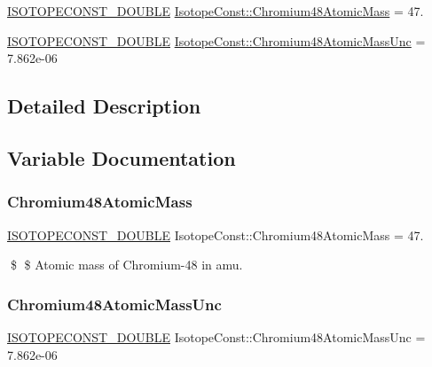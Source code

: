 \begin{DoxyCompactItemize}
\item 
\mbox{\hyperlink{group___isotope_const-_macros_ga8f45a7272ce02c0b4c65c44636ed719a}{I\+S\+O\+T\+O\+P\+E\+C\+O\+N\+S\+T\+\_\+\+D\+O\+U\+B\+LE}} \mbox{\hyperlink{group___isotope_const-_chromium-_cr48_ga2ec4b802d79b0cb09c93fd1cb402b403}{Isotope\+Const\+::\+Chromium48\+Atomic\+Mass}} = 47.
\item 
\mbox{\hyperlink{group___isotope_const-_macros_ga8f45a7272ce02c0b4c65c44636ed719a}{I\+S\+O\+T\+O\+P\+E\+C\+O\+N\+S\+T\+\_\+\+D\+O\+U\+B\+LE}} \mbox{\hyperlink{group___isotope_const-_chromium-_cr48_gad01af998d204021ed9699705cdabb0e0}{Isotope\+Const\+::\+Chromium48\+Atomic\+Mass\+Unc}} = 7.\+862e-\/06
\end{DoxyCompactItemize}


\subsection{Detailed Description}


\subsection{Variable Documentation}
\mbox{\label{group___isotope_const-_chromium-_cr48_ga2ec4b802d79b0cb09c93fd1cb402b403}} 
\subsubsection{\texorpdfstring{Chromium48\+Atomic\+Mass}{Chromium48AtomicMass}}
{\footnotesize\ttfamily \mbox{\hyperlink{group___isotope_const-_macros_ga8f45a7272ce02c0b4c65c44636ed719a}{I\+S\+O\+T\+O\+P\+E\+C\+O\+N\+S\+T\+\_\+\+D\+O\+U\+B\+LE}} Isotope\+Const\+::\+Chromium48\+Atomic\+Mass = 47.}

\$ \$ Atomic mass of Chromium-\/48 in amu. \mbox{\label{group___isotope_const-_chromium-_cr48_gad01af998d204021ed9699705cdabb0e0}} 
\subsubsection{\texorpdfstring{Chromium48\+Atomic\+Mass\+Unc}{Chromium48AtomicMassUnc}}
{\footnotesize\ttfamily \mbox{\hyperlink{group___isotope_const-_macros_ga8f45a7272ce02c0b4c65c44636ed719a}{I\+S\+O\+T\+O\+P\+E\+C\+O\+N\+S\+T\+\_\+\+D\+O\+U\+B\+LE}} Isotope\+Const\+::\+Chromium48\+Atomic\+Mass\+Unc = 7.\+862e-\/06}

